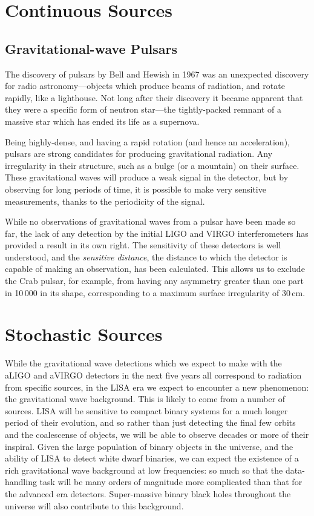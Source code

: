 \documentclass{kentigern}
\begin{document}
\section{Continuous Sources}
\label{sec:continuous-sources}

\subsection{Gravitational-wave Pulsars}
\label{sec:pulsar}

The discovery of pulsars by Bell and Hewish in 1967 was an unexpected
discovery for radio astronomy---objects which produce beams of
radiation, and rotate rapidly, like a lighthouse. Not long after their
discovery it became apparent that they were a specific form of neutron
star---the tightly-packed remnant of a massive star which has ended
its life as a supernova.

Being highly-dense, and having a rapid rotation (and hence an
acceleration), pulsars are strong candidates for producing
gravitational radiation. Any irregularity in their structure, such as
a bulge (or a mountain) on their surface. These gravitational waves
will produce a weak signal in the detector, but by observing for long
periods of time, it is possible to make very sensitive measurements,
thanks to the periodicity of the signal.

While no observations of gravitational waves from a pulsar have been
made so far, the lack of any detection by the initial LIGO and VIRGO
interferometers has provided a result in its own right. The
sensitivity of these detectors is well understood, and the
\emph{sensitive distance}, the distance to which the detector is
capable of making an observation, has been calculated. This allows us
to exclude the Crab pulsar, for example, from having any asymmetry
greater than one part in 10\,000 in its shape\cite{2009LRR....12....2S}, corresponding to a maximum surface
irregularity of 30\,cm\cite{2014ApJ...785..119A}.

\section{Stochastic Sources}
\label{sec:stochastic-sources}

While the gravitational wave detections which we expect to make with
the aLIGO and aVIRGO detectors in the next five years all correspond
to radiation from specific sources, in the LISA era we expect to
encounter a new phenomenon: the gravitational wave
background\cite{2009LRR....12....2S}. This is likely to come from a
number of sources. LISA will be sensitive to compact binary systems
for a much longer period of their evolution, and so rather than just
detecting the final few orbits and the coalescense of objects, we will
be able to observe decades or more of their inspiral. Given the large
population of binary objects in the universe, and the ability of LISA
to detect white dwarf binaries, we can expect the existence of a rich
gravitational wave background at low frequencies: so much so that the
data-handling task will be many orders of magnitude more complicated
than that for the advanced era detectors.  Super-massive binary black
holes throughout the universe will also contribute to this background.
\end{document}
